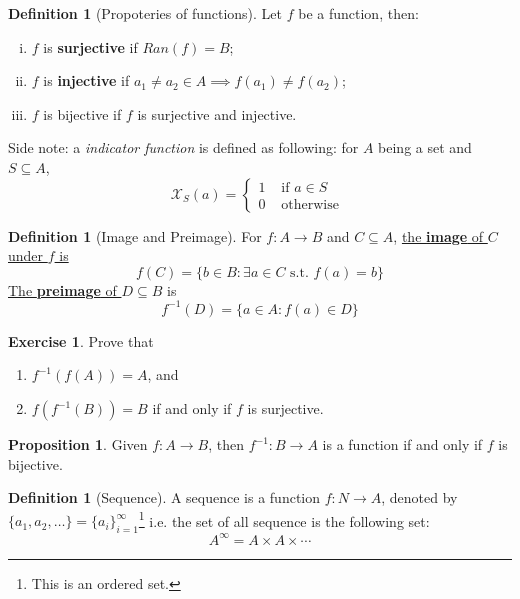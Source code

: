 \documentclass[12pt]{article}
\theoremstyle{definition}
\newtheorem{definition}[theorem]{Definition}
\newtheorem*{exercise_nonum}{Exercise}
\newtheorem{proposition}[theorem]{Proposition}
\theoremstyle{plain}
\begin{document}
\begin{definition}
    [Propoteries of functions] Let $f$ be a function, then: 
    \begin{enumerate}[(i)]
        \item $f$ is \textbf{surjective} if $Ran(f) = B$; 
        \item $f$ is \textbf{injective} if $a_1 \not = a_2 \in A \implies f(a_1) 
            \not = f(a_2)$; 
        \item $f$ is bijective if $f$ is surjective and injective.
    \end{enumerate}
\end{definition}

\noindent Side note: a \textit{indicator function} is defined as following: for 
$A$ being a set and $S\subseteq A$, 
\[
    \mathcal X_S(a) = 
    \begin{cases}
        1 & \text{ if } a \in S \\
        0 & \text{ otherwise }
    \end{cases}
\]

\begin{definition}
    [Image and Preimage]

    For $f: A \to B$ and $C\subseteq A$, \underline{ the \textbf{image} of $C$ under 
    $f$ is }
    \[
        f(C) = 
        \{ 
            b \in B : \exists a \in C \text{ s.t. } f(a) = b
        \}
    \]
    \underline{The \textbf{preimage} of $D\subseteq B$} is 
    \[
        f^{-1}(D) = 
        \{
            a \in A : f(a) \in D
        \}
    \]

\end{definition}

\begin{exercise_nonum}
    Prove that 
    \begin{enumerate}
        \item $f^{-1}(f(A)) = A$, and
        \item $f(f^{-1}(B)) = B$ if and only if $f$ is surjective.
    \end{enumerate}
\end{exercise_nonum}

\begin{proposition}
    Given $f: A \to B$, then $f^{-1}: B \to A$ is a function if and only if $f$ 
    is bijective.
\end{proposition}

\begin{definition}
    [Sequence]

    A sequence is a function $f: N \to A$, denoted by $\{a_1, a_2, \ldots\} = \{ 
    a_i \}_{i=1}^\infty $\footnote{This is an ordered set.}
    i.e. the set of all sequence is the following set: 
    \[
        A^\infty = A \times A \times \cdots
    \]
\end{definition}
\end{document}
